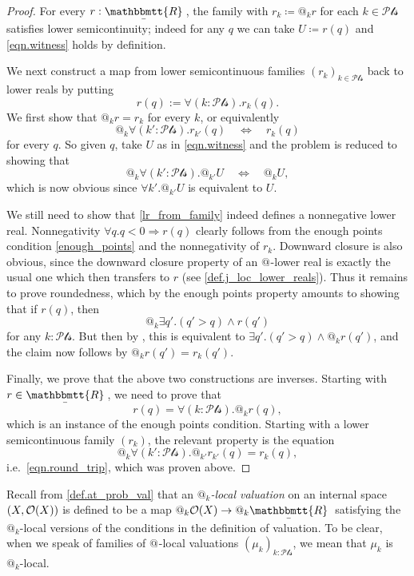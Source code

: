 \documentclass[11pt, oneside, article]{memoir}
\makeatletter
\theoremstyle{plain}
\theoremstyle{definition}
\theoremstyle{remark}
\newcommand{\ubar}[1]{\underaccent{\bar}{#1}}
\newcommand{\internal}[1]{\raisebox{-.03ex}{$\mathbbmtt{#1}$}}
\newcommand{\hs}{\hspace{1.1pt}}
\newcommand{\trr}{\internal{R}\hs}
\newcommand{\tlrr}{\ubar{\trr}\hs}
\newcommand{\Op}[1][undef]{\ifthenelse{\equal{#1}{undef}}{\mathcal{O}}{\mathcal{O}(#1)}}
\newcommand{\pt}{k}				%
\newcommand{\Pts}{\mathcal{Pts}}		%
\newcommand{\AtSymbol}{{@}}
\newcommand{\At}[1][\pt]{\AtSymbol_{#1}}
\newcommand{\imp}{\Rightarrow}
\makeatother
\begin{document}
\begin{proof}
	For every $r : \tlrr$, the family with $r_\pt\coloneqq \At r$ for each $k\in\Pts$ satisfies lower semicontinuity; indeed for any $q$ we can take $U\coloneqq r(q)$ and \eqref{eqn.witness} holds by definition.

	We next construct a map from lower semicontinuous families $(r_\pt)_{\pt\in\Pts}$ back to lower reals by putting
	\begin{equation}
		\label{lr_from_family}
		r(q) := \forall (\pt : \Pts) . r_\pt(q).
	\end{equation}
	We first show that $\At r = r_\pt$ for every $\pt$, or equivalently
	\[
		\At \forall (\pt':\Pts) . r_{\pt'}(q) \quad \Longleftrightarrow \quad r_\pt(q)
	\]
	for every $q$. So given $q$, take $U$ as in \eqref{eqn.witness} and the problem is reduced to showing that
	\begin{equation}\label{eqn.round_trip}
		\At \forall (\pt':\Pts) . \At[\pt'] U \quad \Longleftrightarrow \quad \At U,
	\end{equation}
	which is now obvious since $\forall \pt' . \At[\pt'] U$ is equivalent to $U$.

	We still need to show that \eqref{lr_from_family} indeed defines a nonnegative lower real. Nonnegativity $\forall q. q<0\imp r(q)$ clearly follows from the enough points condition \cref{enough_points} and the nonnegativity of $r_\pt$. Downward closure is also obvious, since the downward closure property of an $\At[]$-lower real is exactly the usual one which then transfers to $r$ (see \cref{def.j_loc_lower_reals}). Thus it remains to prove roundedness, which by the enough points property amounts to showing that if $r(q)$, then 
	\[
		\At \exists q'. (q' > q) \wedge r(q')
	\]
	for any $\pt : \Pts$. But then by , this is equivalent to $\exists q'. (q' > q)\wedge \At r(q')$, and the claim now follows by $\At r(q') = r_\pt(q')$.

	Finally, we prove that the above two constructions are inverses. Starting with $r \in \tlrr$, we need to prove that
	\[
		r(q) = \forall (\pt : \Pts) . \At r(q),
	\]
	which is an instance of the enough points condition. Starting with a lower semicontinuous family $(r_\pt)$, the relevant property is the equation
	\[
		\At \forall (\pt' : \Pts) . \At[\pt'] r_{\pt'}(q) = r_\pt(q),
	\]
	i.e.\ \eqref{eqn.round_trip}, which was proven above.
\end{proof}

Recall from \cref{def.at_prob_val} that an \emph{$\At$-local valuation} on an internal space $(X,\Op[X])$ is defined to be a map $\At \Op[X] \to \At \tlrr$ satisfying the $\At$-local versions of the conditions in the definition of valuation. To be clear, when we speak of families of $\At[]$-local valuations $(\mu_\pt)_{\pt : \Pts}$, we mean that $\mu_\pt$ is $\At[\pt]$-local.
\end{document}
